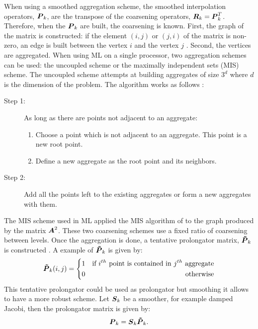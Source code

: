 When using a smoothed aggregation scheme, the smoothed interpolation operators,
$\boldsymbol{P}_k$, are the transpose of the coarsening operators,
$\boldsymbol{R}_k=\boldsymbol{P}_k^T$. Therefore, when the $\boldsymbol{P}_k$ are built, the
coarsening is known. First, the graph of the matrix is constructed: if the element
$(i,j)$ or $(j,i)$ of the matrix is non-zero, an edge is built between the
vertex $i$ and the vertex $j$ \cite{ml_guide}. Second, the vertices are
aggregated. When using ML on a single processor, two aggregation schemes can
be used: the uncoupled scheme or the maximally independent sets (MIS) scheme. 
The uncoupled scheme attempts at building aggregates of size $3^d$ where $d$ is the
dimension of the problem. The algorithm works as follows \cite{mis}:
\begin{description}
  \item[Step 1:] As long as there are points not adjacent to an aggregate:
    \begin{enumerate}
      \item Choose a point which is not adjacent to an aggregate. This point
        is a new root point.
      \item Define a new aggregate as the root point and its neighbors.
    \end{enumerate}
  \item[Step 2:] Add all the points left to the existing aggregates or form a
    new aggregates with them.
\end{description}
The MIS scheme used in ML applied the MIS algorithm of \cite{graph_coloring} to
the graph produced by the matrix $\boldsymbol{A}^2$. These two coarsening 
schemes use a fixed ratio of coarsening between levels. Once the aggregation is 
done, a tentative prolongator matrix, $\boldsymbol{\tilde{P}}_k$ is constructed 
\cite{mis}. A example of $\boldsymbol{\tilde{P}}_k$ is given by:
\begin{equation}
  \boldsymbol{\tilde{P}}_k(i,j) = \left\{
  \begin{aligned}
    &1 &\textrm{if }i^{th}\textrm{ point is contained in }j^{th}\textrm{
    aggregate}\\
    & 0 &\textrm{otherwise}
  \end{aligned}
  \right.
\end{equation}
This tentative prolongator could be used as prolongator but smoothing it
allows to have a more robust scheme. Let $\boldsymbol{S}_k$ be a smoother, for example
damped Jacobi, then the prolongator matrix is given by:
\begin{equation}
  \boldsymbol{P}_k = \boldsymbol{S}_k \boldsymbol{\tilde{P}}_k.
\end{equation}

